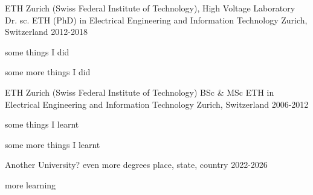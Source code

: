 \begin{cventries}
 \cventry
    {ETH Zurich (Swiss Federal Institute of Technology), High Voltage Laboratory}
    {Dr. sc. ETH (PhD) in Electrical Engineering and Information Technology}
    {Zurich, Switzerland}
    {2012-2018}
    {
    \begin{cvitems}
        \item{some things I did}
        \item{some more things I did}
        \end{cvitems}
    }
    \cventry
    {ETH Zurich (Swiss Federal Institute of Technology)}
    {BSc \& MSc ETH in Electrical Engineering and Information Technology}
    {Zurich, Switzerland}
    {2006-2012}
    {
    \begin{cvitems}
        \item{some things I learnt}
        \item{some more things I learnt}
    \end{cvitems}
    }
    \cventry
    {Another University?}
    {even more degrees}
    {place, state, country}
    {2022-2026}
    {
    \begin{cvitems}
        \item{more learning}
    \end{cvitems}
    }
\end{cventries}
